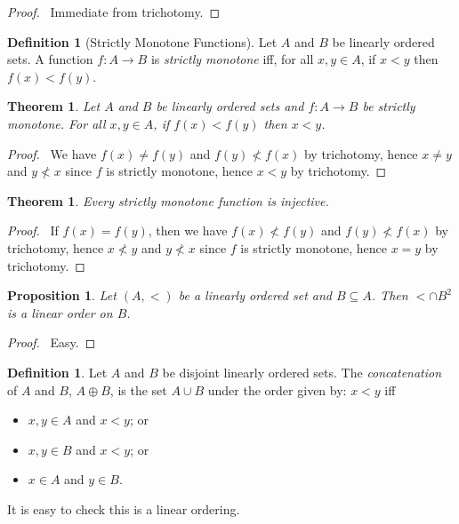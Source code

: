 \documentclass{report}
\let\qed\relax
\newtheorem{proposition}[axiom]{Proposition}
\newtheorem{theorem}[axiom]{Theorem}
\theoremstyle{definition}
\newtheorem{definition}[axiom]{Definition}
\begin{document}
    \begin{proof}
        \pf\ Immediate from trichotomy. \qed
    \end{proof}

    \begin{definition}[Strictly Monotone Functions]
        Let $A$ and $B$ be linearly ordered sets. A function $f : A \rightarrow B$ is \emph{strictly
        monotone} iff, for all $x, y \in A$, if $x < y$ then $f(x) < f(y)$.
    \end{definition}

    \begin{theorem}
        Let $A$ and $B$ be linearly ordered sets and $f : A \rightarrow B$ be strictly monotone.
        For all $x, y \in A$, if $f(x) < f(y)$ then $x < y$.
    \end{theorem}

    \begin{proof}
        \pf\ We have $f(x) \neq f(y)$ and $f(y) \not < f(x)$ by trichotomy, hence $x \neq y$ and $y \not < x$
        since $f$ is strictly monotone, hence $x < y$ by trichotomy. \qed
    \end{proof}

    \begin{theorem}
        Every strictly monotone function is injective.
    \end{theorem}

    \begin{proof}
        \pf\ If $f(x) = f(y)$, then we have $f(x) \not < f(y)$ and $f(y) \not < f(x)$ by trichotomy,
        hence $x \not < y$ and $y \not < x$ since $f$ is strictly monotone, hence $x = y$ by
        trichotomy. \qed
    \end{proof}

    \begin{proposition}
        Let $(A, <)$ be a linearly ordered set and $B \subseteq A$. Then $< \cap B^2$ is a linear order on $B$.
    \end{proposition}

    \begin{proof}
        \pf\ Easy. \qed
    \end{proof}

    \begin{definition}
        Let $A$ and $B$ be disjoint linearly ordered sets. The \emph{concatenation} of $A$ and $B$,
        $A \oplus B$, is the set $A \cup B$ under the order given by: $x < y$ iff
        \begin{itemize}
            \item $x, y \in A$ and $x < y$; or
            \item $x, y \in B$ and $x < y$; or
            \item $x \in A$ and $y \in B$.
        \end{itemize}

        It is easy to check this is a linear ordering.
    \end{definition}
\end{document}
